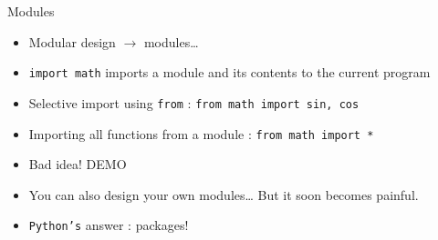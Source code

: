 \documentclass[presentation]{beamer}
\begin{document}
\begin{frame}[label={sec:org43327a2},fragile]{Modules}

\begin{itemize}
\item Modular design \(\rightarrow\) modules\ldots{}
\item \texttt{import math} imports a module and its contents to the current program
\item Selective import using \texttt{from} : \texttt{from math import sin, cos}
\item Importing all functions from a module : \texttt{from math import *}
\item Bad idea! \alert{DEMO}
\item You can also design your own modules\ldots{} But it soon becomes painful.
\item \texttt{Python's} answer : packages!
\end{itemize}
\end{frame}
\end{document}
